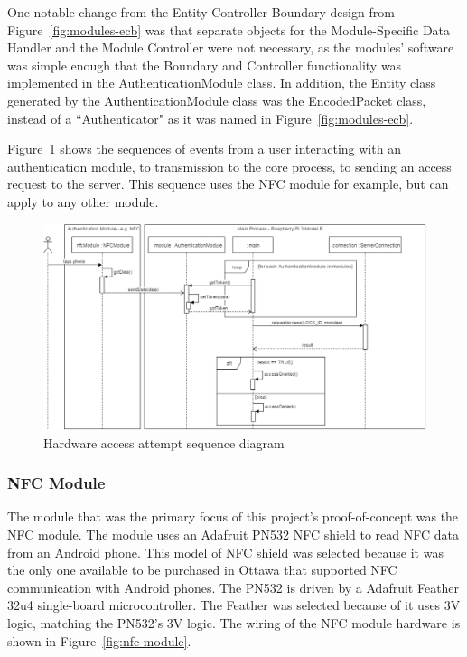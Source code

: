 \documentclass[12pt]{report}
\let\Oldsubsubsection\subsubsection
\renewcommand{\subsubsection}{\FloatBarrier\Oldsubsubsection}
\begin{document}
One notable change from the Entity-Controller-Boundary design from Figure~\ref{fig:modules-ecb} was that separate 
objects for the Module-Specific Data Handler and the Module Controller were not necessary, as the modules' software was 
simple enough that the Boundary and Controller functionality was implemented in the AuthenticationModule class. In 
addition, the Entity class generated by the AuthenticationModule class was the EncodedPacket class, instead of a 
``Authenticator" as it was named in Figure~\ref{fig:modules-ecb}.

Figure~\ref{fig:hardware-interaction-sequence} shows the sequences of events from a user interacting with an 
authentication module, to transmission to the core process, to sending an access request to the server. This sequence 
uses the NFC module for example, but can apply to any other module.

\begin{figure}
    \includegraphics[width=\textwidth]{Diagrams/Hardware-Diagrams/hardware_interaction_sequence}
    \caption{Hardware access attempt sequence diagram}
    \label{fig:hardware-interaction-sequence}
\end{figure}

\subsubsection{NFC Module} \label{nfc-modules}

The module that was the primary focus of this project's proof-of-concept was the NFC module. The module uses an Adafruit 
PN532 NFC shield to read NFC data from an Android phone. This model of NFC shield was selected because it was the only 
one available to be purchased in Ottawa that supported NFC communication with Android phones. The PN532 is driven by a 
Adafruit Feather 32u4 single-board microcontroller. The Feather was selected because of it uses 3V logic, matching the 
PN532's 3V logic. The wiring of the NFC module hardware is shown in Figure~\ref{fig:nfc-module}.
\end{document}

